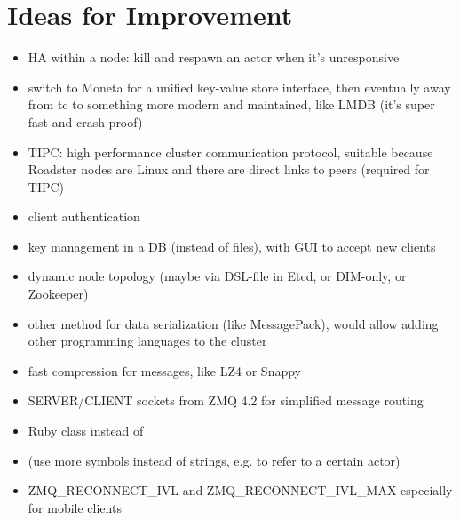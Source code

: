 \section{Ideas for Improvement}
\begin{itemize}
	\item HA within a node: kill and respawn an actor when it's unresponsive
	\item switch to Moneta for a unified key-value store interface, then eventually away from \gls{tc} to something more modern and maintained, like LMDB (it's super fast and crash-proof)
	\item TIPC: high performance cluster communication protocol, suitable because Roadster nodes are Linux and there are direct links to peers (required for TIPC)
	\item client authentication
	\item key management in a DB (instead of files), with GUI to accept new clients
	\item dynamic node topology (maybe via DSL-file in Etcd, or DIM-only, or Zookeeper)
	\item other method for data serialization (like MessagePack), would allow adding other programming languages to the cluster
	\item fast compression for messages, like LZ4 or Snappy
	\item SERVER/CLIENT sockets from ZMQ 4.2 for simplified message routing
	\item Ruby  class instead of 
	\item (use more symbols instead of strings, e.g. to refer to a certain actor)
	\item ZMQ_RECONNECT_IVL and ZMQ_RECONNECT_IVL_MAX especially for mobile clients
\end{itemize}
